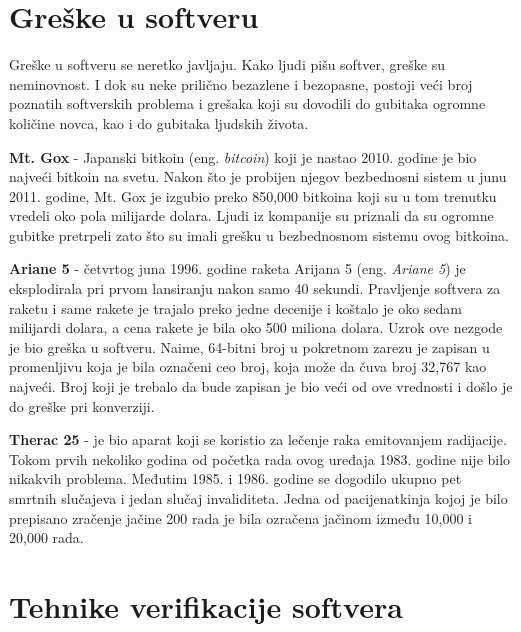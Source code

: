 \documentclass[12pt,oneside]{memoir}
\begin{document}
\section{Greške u softveru} \label{sct:greske}
Greške u softveru se neretko javljaju. Kako ljudi pišu softver, greške su neminovnost. I dok su neke prilično bezazlene i bezopasne, postoji veći broj poznatih softverskih problema i grešaka koji su dovodili do gubitaka ogromne količine novca, kao i do gubitaka ljudskih života.

\begin{description}

    \item \textbf{Mt. Gox} \cite{software_erros} - Japanski bitkoin (eng. \textit{bitcoin}) koji je nastao 2010. godine je bio najveći bitkoin na svetu. Nakon što je probijen njegov bezbednosni sistem u junu 2011. godine, Mt. Gox je izgubio preko 850,000 bitkoina koji su u tom trenutku vredeli oko pola milijarde dolara. Ljudi iz kompanije su priznali da su ogromne gubitke pretrpeli zato što su imali grešku u bezbednosnom sistemu ovog bitkoina.
    
    \item \textbf{Ariane 5} \cite{arriane_5} - četvrtog juna 1996. godine raketa Arijana 5 (eng. \textit{Ariane 5}) je eksplodirala pri prvom lansiranju nakon samo 40 sekundi. Pravljenje softvera za raketu i same rakete je trajalo preko jedne decenije i koštalo je oko sedam milijardi dolara, a cena rakete je bila oko 500 miliona dolara. Uzrok ove nezgode je bio greška u softveru. Naime, 64-bitni broj u pokretnom zarezu je zapisan u promenljivu koja je bila označeni ceo broj, koja može da čuva broj 32,767 kao najveći. Broj koji je trebalo da bude zapisan je bio veći od ove vrednosti i došlo je do greške pri konverziji.
    
    \item \textbf{Therac 25} \cite{therac_25} - je bio aparat koji se koristio za lečenje raka emitovanjem radijacije. Tokom prvih nekoliko godina od početka rada ovog uređaja 1983. godine nije bilo nikakvih problema. Međutim 1985. i 1986. godine se dogodilo ukupno pet smrtnih slučajeva i jedan slučaj invaliditeta. Jedna od pacijenatkinja kojoj je bilo prepisano zračenje jačine 200 rada je bila ozračena jačinom između 10,000 i 20,000 rada.  

\end{description}

\section{Tehnike verifikacije softvera} \label{sct:tehnike}
\end{document}
